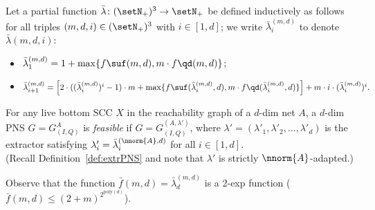 \begin{defi}\label{def:feasiblePNS}
	Let a partial function $\bar{\lambda}\colon (\setN_+)^3\to
	\setN_+$ be defined inductively as
	follows for all triples $(m,d,i)\in (\setN_+)^3$ with
	$i\in[1,d]$;
we write $\bar{\lambda}^{(m,d)}_i$ to denote $\bar{\lambda}(m,d,i)$: 
	\begin{itemize}
		\item			
			$\bar{\lambda}^{(m,d)}_1=1+\max\{f\suf(m,d),m\cdot
			f\qd(m,d)\}$;
\item
	$\bar{\lambda}^{(m,d)}_{i+1}=\left[2\cdot((\bar{\lambda}^{(m,d)}_i)^i-1)\cdot
			m+ \max\{f\suf(\bar{\lambda}^{(m,d)}_i,d), m\cdot
			f\qd(\bar{\lambda}^{(m,d)}_i,d)\}\right]+m\cdot
			i\cdot(\bar{\lambda}^{(m,d)}_i)^i.$
	\end{itemize}
For any live bottom SCC $X$ in the reachability graph of
	a $d$-dim net $A$, 
	a $d$-dim PNS $G=G_{(I,Q)}^A$ is \emph{feasible} if 
	$G=G_{(I,Q)}^{(A,\lambda')}$, where
	$\lambda'=(\lambda'_1,\lambda'_2,\dots,\lambda'_d)$ is the extractor satisfying 
	$\lambda'_i=\bar{\lambda}^{(\nnorm{A},d)}_i$ for all
	$i\in[1,d]$. 
	\\
	(Recall Definition~\ref{def:extrPNS} and note that $\lambda'$
	is strictly $\nnorm{A}$-adapted.)
\end{defi}

\noindent
Observe that the function $\bar{f}(m,d)=\bar{\lambda}^{(m,d)}_d$ is a
2-exp function ($\bar{f}(m,d)\leq (2+m)^{2^{\text{poly}(d)}}$).

